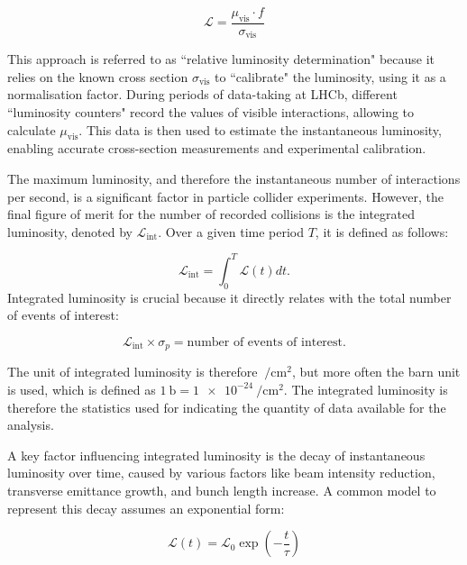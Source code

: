 \begin{equation}
\mathcal{L} = \frac{\mu_{\text{vis}} \cdot f}{\sigma_{\text{vis}}}
\end{equation}

This approach is referred to as ``relative luminosity determination" because it relies on the known cross section $\sigma_{\text{vis}}$ to ``calibrate" the luminosity, using it as a normalisation factor. During periods of data-taking at LHCb, different ``luminosity counters" record the values of visible interactions, allowing to calculate $\mu_{\text{vis}}$. This data is then used to estimate the instantaneous luminosity, enabling accurate cross-section measurements and experimental calibration.


The maximum luminosity, and therefore the instantaneous number of interactions per second, is a significant factor in particle collider experiments. However, the final figure of merit for the number of recorded collisions is the integrated luminosity, denoted by $\mathcal{L}_{\text{int}}$. Over a given time period $T$, it is defined as follows:

\begin{equation}
\mathcal{L}_{\text{int}} = \int_0^T \mathcal{L}(t) dt .
\end{equation}
Integrated luminosity is crucial because it directly relates with the total number of events of interest:

\begin{equation}
\mathcal{L}_{\text{int}} \times \sigma_p = \text{number of events of interest}.
\end{equation}

The unit of integrated luminosity is therefore $\SI{}{\per\centi\meter\squared}$, but more often the barn unit is used, which is defined as $\SI{1}{\barn}=\SI{1e-24}{\per\centi\meter\squared}$. The integrated luminosity is therefore the statistics used for indicating the quantity of data available for the analysis.

A key factor influencing integrated luminosity is the decay of instantaneous luminosity over time, caused by various factors like beam intensity reduction, transverse emittance growth, and bunch length increase. A common model to represent this decay assumes an exponential form:

\begin{equation}
\mathcal{L}(t) = \mathcal{L}_0 \exp\left( -\frac{t}{\tau} \right)
\end{equation}


